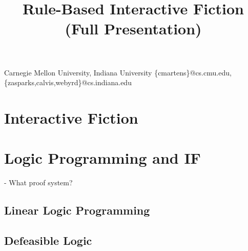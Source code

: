 \documentclass[computermodern]{sigplanconf}
\begin{document}
%

\title{Rule-Based Interactive Fiction (Full Presentation)}


           {Carnegie Mellon University, Indiana University}
           {\{cmartens\}@cs.cmu.edu,\{zasparks,calvis,webyrd\}@cs.indiana.edu}

\maketitle

\section{Interactive Fiction}



\section{Logic Programming and IF}



- What proof system?

\subsection{Linear Logic Programming}



\subsection{Defeasible Logic}



\acks



\nocite{Covington:1996:PPD:230996}
\nocite{apt03principles}
\nocite{Marriottp98Pwc}
\nocite{trs2005}
\nocite{zarfrulespage}




\end{document}
